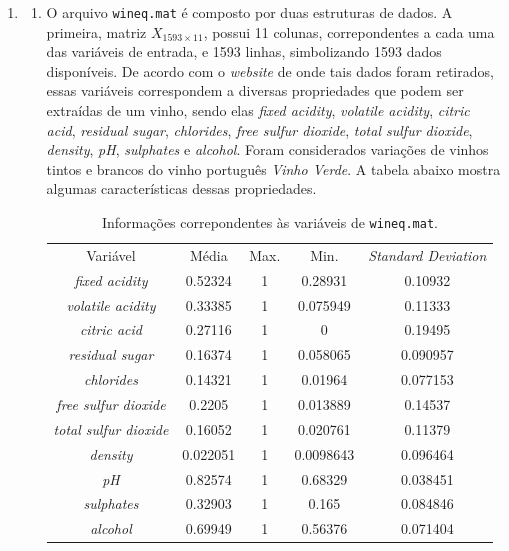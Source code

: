 \begin{enumerate}
		\item \begin{enumerate}
		  \item O arquivo \texttt{wineq.mat} é composto por duas estruturas de dados.
		  A primeira, matriz \(X_{1593 \times 11}\), possui 11 colunas, correpondentes
		  a cada uma das variáveis de entrada, e 1593 linhas, simbolizando 1593 dados
		  disponíveis. De acordo com o \textit{website} de onde tais dados foram
		  retirados, essas variáveis correspondem a diversas propriedades que podem
		  ser extraídas de um vinho, sendo elas \textit{fixed acidity},
		  \textit{volatile acidity}, \textit{citric acid}, \textit{residual sugar},
		  \textit{chlorides}, \textit{free sulfur dioxide}, \textit{total sulfur
		  dioxide}, \textit{density}, \textit{pH}, \textit{sulphates} e
		  \textit{alcohol}. Foram considerados variações de vinhos tintos e brancos do
		  vinho português \textit{Vinho Verde}. A tabela abaixo mostra algumas
		  características dessas propriedades.
		  
		  \begin{table}[H]
			    \centering
				\footnotesize
				\caption{\label{tab:wineq.mat} Informações correpondentes às variáveis de
				\texttt{wineq.mat}.}
				\begin{tabular}{| c | c |  c | c | c |}
				
				\hline
				Variável & Média & Max. & Min. & \textit{Standard Deviation} \\ \hhline{|=|=|=|=|=|} 
				\textit{fixed acidity} & 0.52324 & 1 & 0.28931 &
				0.10932 \\ \hline \textit{volatile acidity} & 0.33385 & 1 & 0.075949 & 0.11333 \\ \hline
				 \textit{citric acid} & 0.27116 & 1 & 0 & 0.19495 \\ \hline
				 \textit{residual sugar} & 0.16374 & 1 & 0.058065 & 0.090957 \\ \hline
				 \textit{chlorides} & 0.14321 & 1 & 0.01964 & 0.077153 \\ \hline
				 \textit{free sulfur dioxide} & 0.2205 & 1 & 0.013889 & 0.14537 \\ \hline
				 \textit{total sulfur dioxide}& 0.16052 & 1 & 0.020761 & 0.11379 \\ \hline
				 \textit{density} & 0.022051 & 1 & 0.0098643 & 0.096464 \\ \hline
				  \textit{pH} & 0.82574 & 1 & 0.68329 & 0.038451 \\ \hline
				 \textit{sulphates}& 0.32903 & 1 & 0.165 & 0.084846 \\ \hline
				 \textit{alcohol} & 0.69949 & 1 & 0.56376 & 0.071404 \\ \hline
				

\end{tabular}
\end{table}
\end{enumerate}
\end{enumerate}
